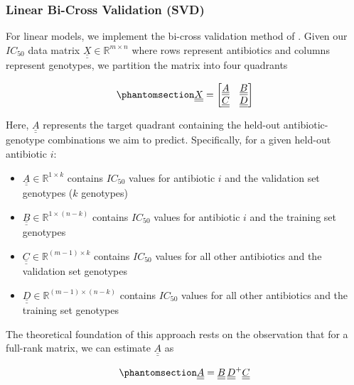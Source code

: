 \documentclass[
]{scrartcl}
\providecommand{\tightlist}{%
  \setlength{\itemsep}{0pt}\setlength{\parskip}{0pt}}\usepackage{longtable,booktabs,array}
\begin{document}
\begin{refsection}
\subsubsection{Linear Bi-Cross Validation
(SVD)}\label{linear-bi-cross-validation-svd}

For linear models, we implement the bi-cross validation method of
\textcite{kinsler2020}. Given our \(IC_{50}\) data matrix
\(\underline{\underline{X}} \in \mathbb{R}^{m
\times n}\) where rows represent antibiotics and columns represent
genotypes, we partition the matrix into four quadrants

\begin{equation}\phantomsection\label{eq-crossvalidation-svd}{
\underline{\underline{X}} = 
\begin{bmatrix}
\underline{\underline{A}} & \underline{\underline{B}} \\
\underline{\underline{C}} & \underline{\underline{D}}
\end{bmatrix}
}\end{equation}

Here, \(\underline{\underline{A}}\) represents the target quadrant
containing the held-out antibiotic-genotype combinations we aim to
predict. Specifically, for a given held-out antibiotic \(i\):

\begin{itemize}
\tightlist
\item
  \(\underline{\underline{A}} \in \mathbb{R}^{1 \times k}\) contains
  \(IC_{50}\) values for antibiotic \(i\) and the validation set
  genotypes (\(k\) genotypes)
\item
  \(\underline{\underline{B}} \in \mathbb{R}^{1 \times (n-k)}\) contains
  \(IC_{50}\) values for antibiotic \(i\) and the training set genotypes
\item
  \(\underline{\underline{C}} \in \mathbb{R}^{(m-1) \times k}\) contains
  \(IC_{50}\) values for all other antibiotics and the validation set
  genotypes
\item
  \(\underline{\underline{D}} \in \mathbb{R}^{(m-1) \times (n-k)}\)
  contains \(IC_{50}\) values for all other antibiotics and the training
  set genotypes
\end{itemize}

The theoretical foundation of this approach rests on the observation
that for a full-rank matrix, we can estimate
\(\underline{\underline{A}}\) as

\begin{equation}\phantomsection\label{eq-crossvalidation-svd-estimate}{
\underline{\underline{A}} = 
\underline{\underline{B}}\, \underline{\underline{D}}^+ \underline{\underline{C}}
}\end{equation}


\end{refsection}
\end{document}
